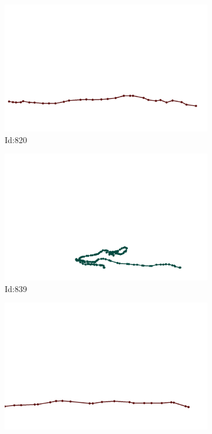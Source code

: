 \documentclass[12pt,twoside]{report}
\begin{document}
\begin{figure}
\begin{subfigure}[b]{0.20\textwidth}
\centering
\includegraphics[width=\textwidth]{../trajectories/820.png}
\caption{Id:820}
\end{subfigure}
\begin{subfigure}[b]{0.20\textwidth}
\centering
\includegraphics[width=\textwidth]{../trajectories/839.png}
\caption{Id:839}
\end{subfigure}
\begin{subfigure}[b]{0.20\textwidth}
\centering
\includegraphics[width=\textwidth]{../trajectories/841.png}

\end{subfigure}
\end{figure}
\end{document}
